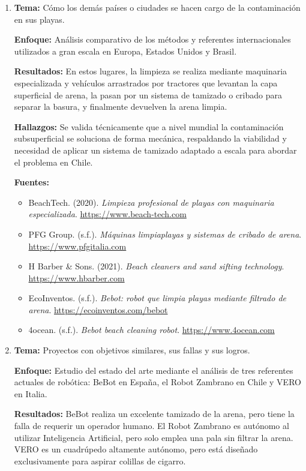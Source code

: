 \documentclass[12pt]{article}
\begin{document}
\begin{enumerate}
\item \textbf{Tema:} Cómo los demás países o ciudades se hacen cargo de la contaminación en sus playas.

\textbf{Enfoque:} Análisis comparativo de los métodos y referentes internacionales utilizados a gran escala en Europa, Estados Unidos y Brasil.

\textbf{Resultados:} En estos lugares, la limpieza se realiza mediante maquinaria especializada y vehículos arrastrados por tractores que levantan la capa superficial de arena, la pasan por un sistema de tamizado o cribado para separar la basura, y finalmente devuelven la arena limpia.

\textbf{Hallazgos:} Se valida técnicamente que a nivel mundial la contaminación subsuperficial se soluciona de forma mecánica, respaldando la viabilidad y necesidad de aplicar un sistema de tamizado adaptado a escala para abordar el problema en Chile.

\textbf{Fuentes:}
\begin{itemize}
\item BeachTech. (2020). \textit{Limpieza profesional de playas con maquinaria especializada}. \url{https://www.beach-tech.com}
\item PFG Group. (s.f.). \textit{Máquinas limpiaplayas y sistemas de cribado de arena}. \url{https://www.pfgitalia.com}
\item H Barber \& Sons. (2021). \textit{Beach cleaners and sand sifting technology}. \url{https://www.hbarber.com}
\item EcoInventos. (s.f.). \textit{Bebot: robot que limpia playas mediante filtrado de arena}. \url{https://ecoinventos.com/bebot}
\item 4ocean. (s.f.). \textit{Bebot beach cleaning robot}. \url{https://www.4ocean.com}
\end{itemize}

\item \textbf{Tema:} Proyectos con objetivos similares, sus fallas y sus logros.

\textbf{Enfoque:} Estudio del estado del arte mediante el análisis de tres referentes actuales de robótica: BeBot en España, el Robot Zambrano en Chile y VERO en Italia.

\textbf{Resultados:} BeBot realiza un excelente tamizado de la arena, pero tiene la falla de requerir un operador humano. El Robot Zambrano es autónomo al utilizar Inteligencia Artificial, pero solo emplea una pala sin filtrar la arena. VERO es un cuadrúpedo altamente autónomo, pero está diseñado exclusivamente para aspirar colillas de cigarro.


\end{enumerate}
\end{document}
